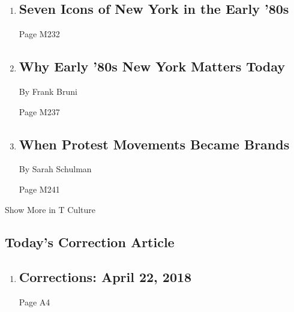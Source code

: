 \begin{enumerate}
\def\labelenumi{\arabic{enumi}.}
\item
  \href{/2018/04/17/t-magazine/carolina-herrera-jennifer-beals-culture-covers.html}{}

  \hypertarget{seven-icons-of-new-york-in-the-early-80s}{%
  \subsection{Seven Icons of New York in the Early
  '80s}\label{seven-icons-of-new-york-in-the-early-80s}}

  Page M232
\item
  \href{/2018/04/17/t-magazine/why-new-york-city-1980s-matters.html}{}

  \hypertarget{why-early-80s-new-york-matters-today}{%
  \subsection{Why Early '80s New York Matters
  Today}\label{why-early-80s-new-york-matters-today}}

  By Frank Bruni

  Page M237
\item
  \href{/2018/04/16/t-magazine/1980s-protest-movements.html}{}

  \hypertarget{when-protest-movements-became-brands}{%
  \subsection{When Protest Movements Became
  Brands}\label{when-protest-movements-became-brands}}

  By Sarah Schulman

  Page M241
\end{enumerate}

Show More in T Culture

\hypertarget{todays-correction-article}{%
\subsection{Today's Correction
Article}\label{todays-correction-article}}

\begin{enumerate}
\def\labelenumi{\arabic{enumi}.}
\item
  \href{/2018/04/21/pageoneplus/corrections-april-22-2018.html}{}

  \hypertarget{corrections-april-22-2018}{%
  \subsection{Corrections: April 22,
  2018}\label{corrections-april-22-2018}}

  Page A4
\end{enumerate}

